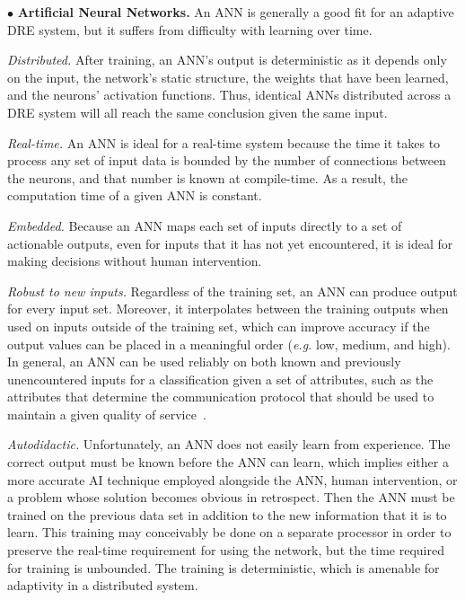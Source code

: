 \documentclass[conference]{IEEEtran}
\begin{document}

$\bullet$ {\bf Artificial Neural Networks.}
An ANN is generally a  good fit for an adaptive DRE system, but it suffers from difficulty with learning over time.

\emph{Distributed.} After training, an ANN's output is deterministic as it depends only on the input, the network's static structure, the weights that have been learned, and the neurons' activation functions. Thus, identical ANNs distributed across a DRE system will all reach the same conclusion given the same input.

\emph{Real-time.} An ANN is ideal for a real-time system because the time it takes to process any set of input data is bounded by the number of connections between the neurons, and that number is known at compile-time. As a result, the computation time of a given ANN is constant.

\emph{Embedded.} Because an ANN maps each set of inputs directly to a set of actionable outputs, even for inputs that it has not yet encountered, it is ideal for making decisions without human intervention.

\emph{Robust to new inputs.} Regardless of the training set, an ANN can produce output for every input set. Moreover, it interpolates between the training outputs when used on inputs outside of the training set, which can improve accuracy if the output values can be placed in a meaningful order (\emph{e.g.} low, medium, and high). In general, an ANN can be used reliably on both known and previously unencountered inputs for a classification given a set of attributes, such as the attributes that determine the communication protocol that should be used to maintain a given quality of service~\cite{Hoffert:10}.

\emph{Autodidactic.} Unfortunately, an ANN does not easily learn from experience. The correct output must be known before the ANN can learn, which implies either a more accurate AI technique employed alongside the ANN, human intervention, or a problem whose solution becomes obvious in retrospect. Then the ANN must be trained on the previous data set in addition to the new information that it is to learn. This training may conceivably be done on a separate processor in order to preserve the real-time requirement for using the network, but the time required for training is unbounded. The training is deterministic, which is amenable for adaptivity in a distributed system.
\end{document}
